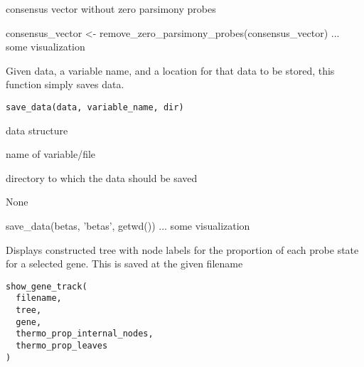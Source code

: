 \documentclass[a4paper]{book}
\begin{document}
%
\begin{Value}
consensus vector without zero parsimony probes
\end{Value}
%
\begin{Examples}
\begin{ExampleCode}
consensus_vector <- remove_zero_parsimony_probes(consensus_vector)
... some visualization 
\end{ExampleCode}
\end{Examples}
%
\begin{Description}\relax
Given data, a variable name, and a location for that data to be stored, 
this function simply saves data.
\end{Description}
%
\begin{Usage}
\begin{verbatim}
save_data(data, variable_name, dir)
\end{verbatim}
\end{Usage}
%
\begin{Arguments}
\begin{ldescription}
\item[\code{data}] data structure

\item[\code{variable\_name}] name of variable/file

\item[\code{dir}] directory to which the data should be saved
\end{ldescription}
\end{Arguments}
%
\begin{Value}
None
\end{Value}
%
\begin{Examples}
\begin{ExampleCode}
save_data(betas, 'betas', getwd())
... some visualization 
\end{ExampleCode}
\end{Examples}
%
\begin{Description}\relax
Displays constructed tree with node labels for the proportion of each probe 
state for a selected gene. This is saved at the given filename
\end{Description}
%
\begin{Usage}
\begin{verbatim}
show_gene_track(
  filename,
  tree,
  gene,
  thermo_prop_internal_nodes,
  thermo_prop_leaves
)
\end{verbatim}
\end{Usage}
\end{document}
